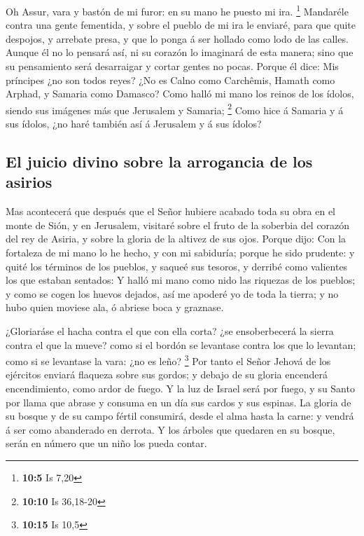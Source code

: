  Oh Assur, vara y bastón de mi furor: en su mano he puesto
mi ira. \footnote{\textbf{10:5} Is 7,20}  Mandaréle contra
una gente fementida, y sobre el pueblo de mi ira le enviaré, para que
quite despojos, y arrebate presa, y que lo ponga á ser hollado como lodo
de las calles.  Aunque él no lo pensará así, ni su corazón
lo imaginará de esta manera; sino que su pensamiento será desarraigar y
cortar gentes no pocas.  Porque él dice: Mis príncipes ¿no
son todos reyes?  ¿No es Calno como Carchêmis, Hamath como
Arphad, y Samaria como Damasco?  Como halló mi mano los
reinos de los ídolos, siendo sus imágenes más que Jerusalem y Samaria;
\footnote{\textbf{10:10} Is 36,18-20}  Como hice á Samaria
y á sus ídolos, ¿no haré también así á Jerusalem y á sus ídolos?

\hypertarget{el-juicio-divino-sobre-la-arrogancia-de-los-asirios}{%
\subsection{El juicio divino sobre la arrogancia de los
asirios}\label{el-juicio-divino-sobre-la-arrogancia-de-los-asirios}}

 Mas acontecerá que después que el Señor hubiere acabado
toda su obra en el monte de Sión, y en Jerusalem, visitaré sobre el
fruto de la soberbia del corazón del rey de Asiria, y sobre la gloria de
la altivez de sus ojos.  Porque dijo: Con la fortaleza de
mi mano lo he hecho, y con mi sabiduría; porque he sido prudente: y
quité los términos de los pueblos, y saqueé sus tesoros, y derribé como
valientes los que estaban sentados:  Y halló mi mano como
nido las riquezas de los pueblos; y como se cogen los huevos dejados,
así me apoderé yo de toda la tierra; y no hubo quien moviese ala, ó
abriese boca y graznase.

 ¿Gloriaráse el hacha contra el que con ella corta? ¿se
ensoberbecerá la sierra contra el que la mueve? como si el bordón se
levantase contra los que lo levantan; como si se levantase la vara: ¿no
es leño? \footnote{\textbf{10:15} Is 10,5}  Por tanto el
Señor Jehová de los ejércitos enviará flaqueza sobre sus gordos; y
debajo de su gloria encenderá encendimiento, como ardor de fuego.
 Y la luz de Israel será por fuego, y su Santo por llama
que abrase y consuma en un día sus cardos y sus espinas. 
La gloria de su bosque y de su campo fértil consumirá, desde el alma
hasta la carne: y vendrá á ser como abanderado en derrota. 
Y los árboles que quedaren en su bosque, serán en número que un niño los
pueda contar.

